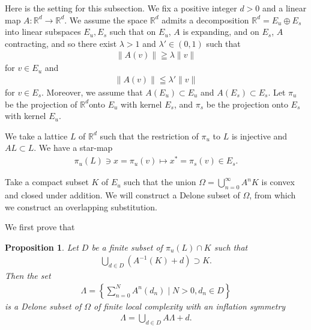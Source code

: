 \documentclass[a4]{amsart}
\newtheorem{prop}[theorem]{Proposition}
\theoremstyle{definition}
\begin{document}
Here is the setting for this subsection.
We fix a positive integer $d>0$ and a linear map
$A\colon\mathbb{R}^d\rightarrow\mathbb{R}^d$. 
We assume the space $\mathbb{R}^d$
admits a decomposition
$\mathbb{R}^d=E_u\oplus E_s$ into
linear subspaces $E_u,E_s$ such that on
$E_u$, $A$ is expanding, and
on $E_s$, $A$ contracting, and so
there exist $\lambda>1$ and $\lambda'\in (0,1)$ such that
\begin{align*}
    \|A(v)\|\geqq\lambda\|v\|
\end{align*}
for $v\in E_u$ and
\begin{align*}
    \|A(v)\|\leqq\lambda'\|v\|
\end{align*}
for $v\in E_s$. Moreover, we assume
that $A(E_u)\subset E_u$ and
$A(E_s)\subset E_s$.
Let $\pi_u$ be the projection 
of $\mathbb{R}^d$onto
$E_u$ with kernel $E_s$, and
$\pi_s$ be the projection onto $E_s$
with kernel $E_u$.

We take a lattice $L$ of $\mathbb{R}^d$
such that the restriction of $\pi_u$
to $L$ is injective and $AL\subset L$. We have a star-map
\begin{align*}
    \pi_u(L)\ni x=\pi_u(v)\mapsto x^*=\pi_s(v)\in E_s.
\end{align*}


Take a compact subset $K$ of
$E_u$ such that the
union $\Omega=\bigcup_{n=0}^{\infty}A^nK$ is convex and closed under addition. 
We will
construct a Delone subset of $\Omega$,
from which we construct an overlapping
substitution.

We first prove that
\begin{prop}\label{prop1_construction_high-dim}
    Let $D$ be a finite subset of $\pi_u(L)\cap K$ such that
    \begin{align*}
        \bigcup_{d\in D}(A^{-1}(K)+d)\supset K.
    \end{align*}
Then the set
\begin{align*}
    \Lambda=\left\{\sum_{n=0}^NA^n(d_n)\mid N>0, d_n\in D\right\}
\end{align*}
is a Delone subset of $\Omega$ of finite
 local complexity with an
inflation symmetry
\begin{align*}
    \Lambda=\bigcup_{d\in D}A\Lambda+d.
\end{align*}
\end{prop}
\end{document}
